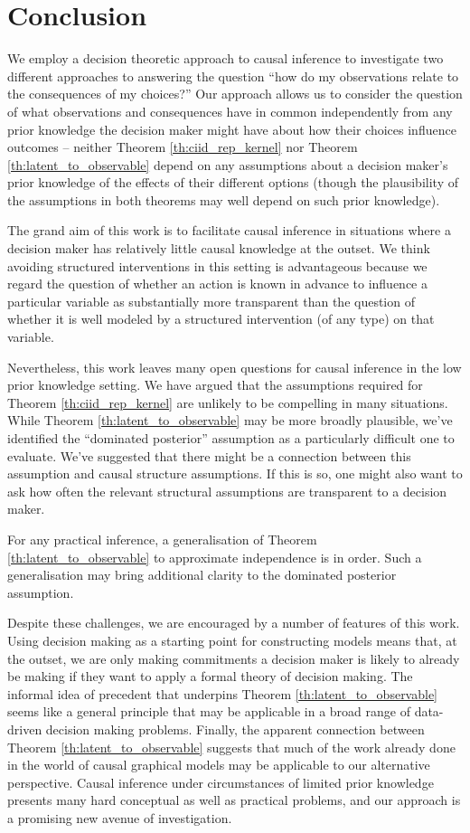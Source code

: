 \section{Conclusion}

We employ a decision theoretic approach to causal inference to investigate two different approaches to answering the question ``how do my observations relate to the consequences of my choices?'' Our approach allows us to consider the question of what observations and consequences have in common independently from any prior knowledge the decision maker might have about how their choices influence outcomes -- neither Theorem \ref{th:ciid_rep_kernel} nor Theorem \ref{th:latent_to_observable} depend on any assumptions about a decision maker's prior knowledge of the effects of their different options (though the plausibility of the assumptions in both theorems may well depend on such prior knowledge).

The grand aim of this work is to facilitate causal inference in situations where a decision maker has relatively little causal knowledge at the outset. We think avoiding structured interventions in this setting is advantageous because we regard the question of whether an action is known in advance to influence a particular variable as substantially more transparent than the question of whether it is well modeled by a structured intervention (of any type) on that variable.

Nevertheless, this work leaves many open questions for causal inference in the low prior knowledge setting. We have argued that the assumptions required for Theorem \ref{th:ciid_rep_kernel} are unlikely to be compelling in many situations. While Theorem \ref{th:latent_to_observable} may be more broadly plausible, we've identified the ``dominated posterior'' assumption as a particularly difficult one to evaluate. We've suggested that there might be a connection between this assumption and causal structure assumptions. If this is so, one might also want to ask how often the relevant structural assumptions are transparent to a decision maker.

For any practical inference, a generalisation of Theorem \ref{th:latent_to_observable} to approximate independence is in order. Such a generalisation may bring additional clarity to the dominated posterior assumption.

Despite these challenges, we are encouraged by a number of features of this work. Using decision making as a starting point for constructing models means that, at the outset, we are only making commitments a decision maker is likely to already be making if they want to apply a formal theory of decision making. The informal idea of precedent that underpins Theorem \ref{th:latent_to_observable} seems like a general principle that may be applicable in a broad range of data-driven decision making problems. Finally, the apparent connection between Theorem \ref{th:latent_to_observable} suggests that much of the work already done in the world of causal graphical models may be applicable to our alternative perspective. Causal inference under circumstances of limited prior knowledge presents many hard conceptual as well as practical problems, and our approach is a promising new avenue of investigation.